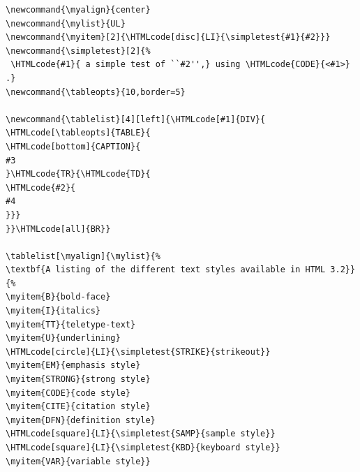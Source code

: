 
\begin{small}
\begin{verbatim}
\newcommand{\myalign}{center}
\newcommand{\mylist}{UL}
\newcommand{\myitem}[2]{\HTMLcode[disc]{LI}{\simpletest{#1}{#2}}}
\newcommand{\simpletest}[2]{%
 \HTMLcode{#1}{ a simple test of ``#2'',} using \HTMLcode{CODE}{<#1>} .}
\newcommand{\tableopts}{10,border=5}

\newcommand{\tablelist}[4][left]{\HTMLcode[#1]{DIV}{
\HTMLcode[\tableopts]{TABLE}{
\HTMLcode[bottom]{CAPTION}{
#3
}\HTMLcode{TR}{\HTMLcode{TD}{
\HTMLcode{#2}{
#4
}}}
}}\HTMLcode[all]{BR}}

\tablelist[\myalign]{\mylist}{%
\textbf{A listing of the different text styles available in HTML 3.2}}{%
\myitem{B}{bold-face}
\myitem{I}{italics}
\myitem{TT}{teletype-text}
\myitem{U}{underlining}
\HTMLcode[circle]{LI}{\simpletest{STRIKE}{strikeout}}
\myitem{EM}{emphasis style}
\myitem{STRONG}{strong style}
\myitem{CODE}{code style}
\myitem{CITE}{citation style}
\myitem{DFN}{definition style}
\HTMLcode[square]{LI}{\simpletest{SAMP}{sample style}}
\HTMLcode[square]{LI}{\simpletest{KBD}{keyboard style}}
\myitem{VAR}{variable style}}
\end{verbatim}
\end{small}


